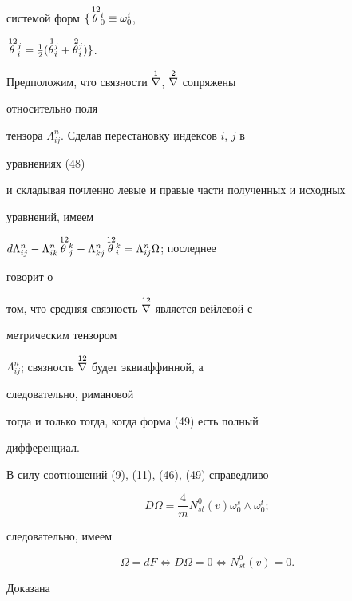 системой форм $\{\overset{\,12}{\theta}{}^i_0\equiv\omega^i_0$, 


$\up{\,12}{\theta}^j_i=\frac{1}{2}(\up{\,1}{\theta}^j_i+ 


\up{\,2}{\theta}^j_i)\}$. 


 


Предположим, что связности $\overset{1}{\nabla}{}$, $\overset{2}{\nabla}{}$ сопряжены 


относительно поля 


тензора $\Lambda^n_{ij}$. Сделав перестановку индексов $i$, $j$ в 


уравнениях (48)  


и складывая почленно левые и правые части полученных и исходных 


уравнений, имеем 


$d\Lambda^n_{ij}-\Lambda^n_{i k}\up{\,12}{\theta}^k_j- 


\Lambda^n_{k j}\up{\,12}{\theta}^k_i=\Lambda^n_{ij}\Omega$; последнее 


говорит о 


том, что средняя связность $\overset{12}{\nabla}{}$ является вейлевой с 


метрическим тензором 


$\Lambda^n_{ij}$; связность $\overset{12}{\nabla}{}$ будет эквиаффинной, а 


следовательно, римановой 


тогда и только тогда, когда форма (49) есть полный  


дифференциал. 


 


В силу соотношений (9), (11), (46), (49) справедливо 


$$ 


D\Omega=\frac{4}{m}N^0_{s t}(v)\omega^s_0\wedge\omega^t_0; 


$$ 


следовательно, имеем 


$$ 


\Omega=dF\Leftrightarrow D\Omega=0\Leftrightarrow 


N^0_{s t}(v)=0. 


$$ 


 


Доказана 


 


